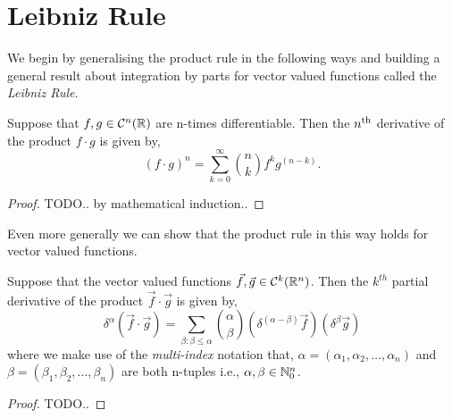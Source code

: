 
\section{Leibniz Rule} %
\label{sec:leibnizrule}

We begin by generalising the product rule in the following ways
and building a general result about integration by parts for
vector valued functions called the \emph{Leibniz Rule}.

\begin{prop}
  Suppose that $f,g \in \mathcal{C}^n(\mathbb{R})$ are n-times differentiable.
  Then the $n\textsuperscript{th}$ derivative of the product $f \cdot g$ is given by,
  \[
    (f \cdot g)^n = \sum_{k=0}^{\infty} \binom{n}{k} f^{k} g^{(n-k)}.
  \]
\end{prop}

\begin{proof}
  TODO.. by mathematical induction..
\end{proof}

Even more generally we can show that the product rule in this way
holds for vector valued functions.

\begin{prop}
  Suppose that the vector valued functions $\vec{f},\vec{g} \in \mathcal{C}^k(\mathbb{R}^n)$.
  Then the $k^{th}$ partial derivative of the product $\vec{f} \cdot \vec{g}$ is given by,
  \[
  \delta^{\alpha} (\vec{f} \cdot \vec{g}) =
  \sum_{\beta : \beta \leq \alpha} \binom{\alpha}{\beta} (\delta^{(\alpha - \beta)} \vec{f}) (\delta^{\beta} \vec{g})
 \]
 where we make use of the \emph{multi-index} notation that,
 $\alpha = (\alpha_1, \alpha_2, \dots, \alpha_n)$ and $\beta = (\beta_1, \beta_2, \dots, \beta_n)$
 are both n-tuples i.e., $\alpha, \beta \in \mathbb{N}^n_0$.
\end{prop}

\begin{proof}
  TODO..
\end{proof}
